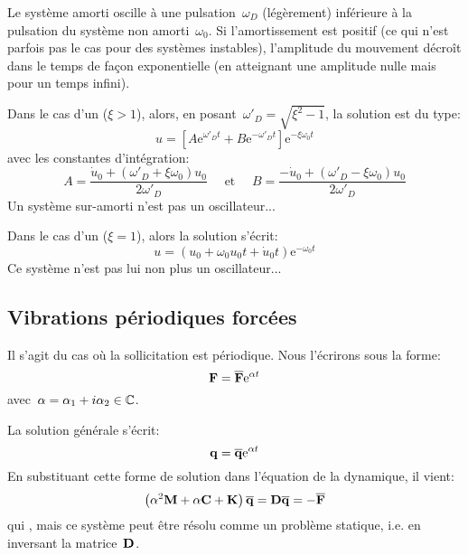 Le système amorti oscille à une pulsation~$\omega_D$ (légèrement) inférieure à la pulsation du
système non amorti~$\omega_0$. Si l'amortissement est positif (ce qui n’est parfois pas le cas
pour des systèmes instables), l'amplitude du mouvement décroît dans le temps de façon
exponentielle (en atteignant une amplitude nulle mais pour un temps infini).

\medskip
Dans le cas d'un  ($\xi>1$), alors, en posant~$\omega'_D=\sqrt{\xi^2-1}$, la solution est du type:
\begin{equation} u=\left[A\mathrm{e}^{\omega'_D t}+B\mathrm{e}^{-\omega'_D t}\right] \mathrm{e}^{-\xi\omega_0t} \end{equation}
avec les constantes d'intégration:
\begin{equation}A=\dfrac{\dot{u}_0+(\omega'_D+\xi\omega_0)u_0}{2\omega'_D} \quad \text{ et }\quad
B=\dfrac{-\dot{u}_0+(\omega'_D-\xi\omega_0)u_0}{2\omega'_D} \end{equation}
Un système sur-amorti n'est pas un oscillateur...

\medskip
Dans le cas d'un  ($\xi=1$), alors la solution s'écrit:
\begin{equation}
u = (u_0+\omega_0u_0t+\dot{u}_0t)\mathrm{e}^{-\omega_0 t}
\end{equation}
Ce système n'est pas lui non plus un oscillateur...




\medskip{}
\subsection{Vibrations périodiques forcées}

Il s'agit du cas où la sollicitation est périodique. Nous l'écrirons sous la forme:
\begin{equation} \VV{F}=\VV{\overline{F}}\mathrm{e}^{\alpha t} \end{equation}
avec~$\alpha=\alpha_1+i\alpha_2\in\mathbb C$.

La solution générale s'écrit:
\begin{equation} \VV{q}=\VV{\overline{q}}\mathrm{e}^{\alpha t} \end{equation}
En substituant cette forme de solution dans l'équation de la dynamique, il vient:
\begin{equation} \left(\alpha^2\MM{M}+\alpha\MM{C}+\MM{K}\right)\VV{\overline{q}}=\MM{D}\VV{\overline{q}}=-\VV{\overline{F}} \end{equation}
qui , mais ce système peut être résolu
comme un problème statique, i.e. en inversant la matrice~$\MM{D}$. 

